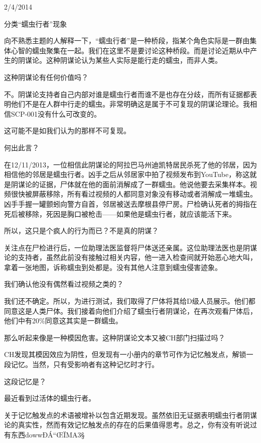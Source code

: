 \begin{scpbox}

2\slash 4\slash 2014

分类“蠕虫行者”现象


向不熟悉主题的人解释一下，“蠕虫行者”是一种桥段，指某个角色实际是一群由集体心智的蠕虫聚集在一起。我们在这里不是要讨论这种桥段。而是讨论近期从中产生的阴谋论。这种阴谋论认为某些人实际是能行走的蠕虫，而非人类。

这种阴谋论有任何价值吗？

不。阴谋论支持者自己内部对谁是蠕虫行者而谁不是也存在分歧，而所有证据都表明他们不是在人群中行走的蠕虫。非常明确这是属于不可复现的阴谋论理论。我相信SCP-001没有什么可改变的。

这可能不是如我们认为的那样不可复现。

何出此言？

在12\slash 11\slash 2013，一位相信此阴谋论的阿拉巴马州迪凯特居民杀死了他的邻居，因为相信他的邻居是蠕虫行者。凶手之后从邻居家中拍了视频发布到YouTube，称这就是阴谋论的证据，尸体就在他的面前消解成了一群蠕虫。他说他要去采集样本。视频很快被屏蔽移除，所有看过视频的人都同意对象没有移动或者消解成一堆蠕虫。凶手手握一罐颤蚓向警方自首，邻居被送去摩根县停尸房。尸检确认死者的拇指在死后被移除，死因是胸口被枪击——如果他是蠕虫行者，就应该能活下来。

所以，这只是个疯人的行为而已？不是真的阴谋？

关注点在尸检进行后，一位助理法医监督将尸体送还亲属。这位助理法医也是阴谋论的支持者，虽然此前没有接触过相关内容，他一进入检查间就开始恶心地大叫，拿着一张地图，诉称蠕虫到处都是。没有其他人注意到蠕虫侵害迹象。

我们确认他没有偶然看过视频之类的？

我们还不确定。所以，为进行测试，我们取得了尸体将其给D级人员展示。他们都同意这是人类尸体。我们接着向他们介绍了蠕虫行者阴谋论，在再次观看尸体后，他们中有20\%同意这其实是一群蠕虫。

那么听起来像是一种模因危害。这种阴谋论文本又被CH部门扫描过吗？

CH发现其模因效应为阴性，但发现有一小册内的章节可作为记忆触发点，解锁一段记忆。当然，只有受影响者有这种记忆时才行。

这段记忆是？

最近看到过活体的蠕虫行者。

关于记忆触发点的术语被增补以包含近期发现。虽然依旧无证据表明蠕虫行者阴谋论的真实性，然而有效记忆触发点的存在的后果值得思考。总之，你有没有听说过有东西dowwÐÁ“ŒÏMA3§

\end{scpbox}

